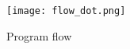 \begin{figure}
	\centering
	\texttt{[image: flow\_dot.png]}
	\caption{Program flow}\label{fig:use_flow}
\end{figure}
